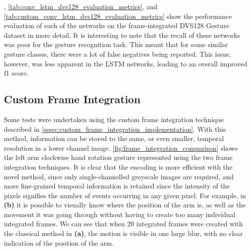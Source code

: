 , \cref{tab:conv_lstm_dvs128_evaluation_metrics}, and \cref{tab:custom_conv_lstm_dvs128_evaluation_metrics} show the performance evaluation of each of the networks on the frame-integrated DVS128 Gesture dataset in more detail. It is interesting to note that the recall of these networks was poor for the gesture recognition task. This meant that for some similar gesture classes, there were a lot of false negatives being reported. This issue, however, was less apparent in the LSTM networks, leading to an overall improved f1 score.

\subsection{Custom Frame Integration}

Some tests were undertaken using the custom frame integration technique described in \cref{sssec:custom_frame_integration_implementation}. With this method, information can be stored to the same, or even smaller, temporal resolution in a lower channel image. \cref{fig:frame_integration_comparison} shows the left arm clockwise hand rotation gesture represented using the two frame integration techniques. It is clear that the encoding is more efficient with the novel method, since only single-channelled greyscale images are required, and more fine-grained temporal information is retained since the intensity of the pixels signifies the number of events occurring in any given pixel. For example, in \textbf{(b)} it is possible to visually know where the position of the arm is, as well as the movement it was going through without having to create too many individual integrated frames. We can see that when 20 integrated frames were created with the classical method in \textbf{(a)}, the motion is visible in one large blur, with no clear indication of the position of the arm.

